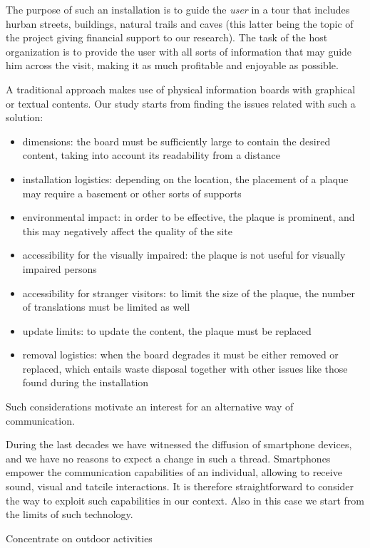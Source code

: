 \documentclass[sustainability,article,submit,pdftex,moreauthors]{Definitions/mdpi}
\begin{document}
The purpose of such an installation is to guide the {\em user} in a tour that includes hurban streets, buildings, natural trails and caves (this latter being the topic of the project giving financial support to our research). The task of the host organization is to provide the user with all sorts of information that may guide him across the visit, making it as much profitable and enjoyable as possible.

A traditional approach makes use of physical information boards with graphical or textual contents. Our study starts from finding the issues related with such a solution:

\begin{itemize}
\item dimensions: the board must be sufficiently large to contain the desired content, taking into account its readability from a distance
\item installation logistics: depending on the location, the placement of a plaque may require a basement or other sorts of supports
\item environmental impact: in order to be effective, the plaque is prominent, and this may negatively affect the quality of the site 
\item accessibility for the visually impaired: the plaque is not useful for visually impaired persons
\item accessibility for stranger visitors: to limit the size of the plaque, the number of translations must be limited as well
\item update limits: to update the content, the plaque must be replaced
\item removal logistics: when the board degrades it must be either removed or replaced, which entails waste disposal together with other issues like those found during the installation
\end{itemize}

Such considerations motivate an interest for an alternative way of communication. 

During the last decades we have witnessed the diffusion of smartphone devices, and we have no reasons to expect a change in such a thread. Smartphones empower the communication capabilities of an individual, allowing to receive sound, visual and tatcile interactions. It is therefore straightforward to consider the way to exploit such capabilities in our context. Also in this case we start from the limits of such technology.

Concentrate on outdoor activities
\end{document}
